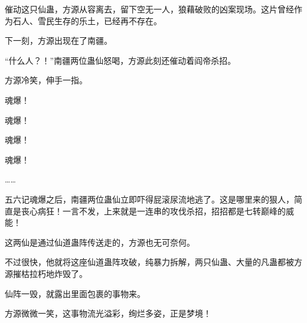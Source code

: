 \begin{this_body}
催动这只仙蛊，方源从容离去，留下空无一人，狼藉破败的凶案现场。这片曾经作为石人、雪民生存的乐土，已经再不存在。

下一刻，方源出现在了南疆。

“什么人？！”南疆两位蛊仙怒喝，方源此刻还催动着阎帝杀招。

方源冷笑，伸手一指。

魂爆！

魂爆！

魂爆！

魂爆！

……

五六记魂爆之后，南疆两位蛊仙立即吓得屁滚尿流地逃了。这是哪里来的狠人，简直是丧心病狂！一言不发，上来就是一连串的攻伐杀招，招招都是七转巅峰的威能！

这两仙是通过仙道蛊阵传送走的，方源也无可奈何。

不过很快，他就将这座仙道蛊阵攻破，纯暴力拆解，两只仙蛊、大量的凡蛊都被方源摧枯拉朽地炸毁了。

仙阵一毁，就露出里面包裹的事物来。

方源微微一笑，这事物流光溢彩，绚烂多姿，正是梦境！

\end{this_body}

